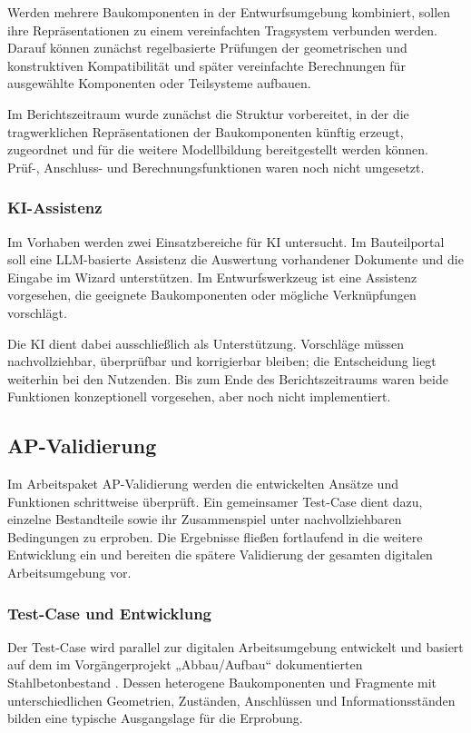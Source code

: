 \documentclass[type=zwischenbericht,theme=dark]{zukunftbau}
\begin{document}
Werden mehrere Baukomponenten in der Entwurfsumgebung kombiniert, sollen ihre Repräsentationen zu einem vereinfachten Tragsystem verbunden werden. Darauf können zunächst regelbasierte Prüfungen der geometrischen und konstruktiven Kompatibilität und später vereinfachte Berechnungen für ausgewählte Komponenten oder Teilsysteme aufbauen.

Im Berichtszeitraum wurde zunächst die Struktur vorbereitet, in der die tragwerklichen Repräsentationen der Baukomponenten künftig erzeugt, zugeordnet und für die weitere Modellbildung bereitgestellt werden können. Prüf-, Anschluss- und Berechnungsfunktionen waren noch nicht umgesetzt.

\subsubsection{KI-Assistenz}
Im Vorhaben werden zwei Einsatzbereiche für KI untersucht. Im Bauteilportal soll eine LLM-basierte Assistenz die Auswertung vorhandener Dokumente und die Eingabe im Wizard unterstützen. Im Entwurfswerkzeug ist eine Assistenz vorgesehen, die geeignete Baukomponenten oder mögliche Verknüpfungen vorschlägt.

Die KI dient dabei ausschließlich als Unterstützung. Vorschläge müssen nachvollziehbar, überprüfbar und korrigierbar bleiben; die Entscheidung liegt weiterhin bei den Nutzenden. Bis zum Ende des Berichtszeitraums waren beide Funktionen konzeptionell vorgesehen, aber noch nicht implementiert.

\subsection{AP-Validierung}

Im Arbeitspaket AP-Validierung werden die entwickelten Ansätze und Funktionen schrittweise überprüft. Ein gemeinsamer Test-Case dient dazu, einzelne Bestandteile sowie ihr Zusammenspiel unter nachvollziehbaren Bedingungen zu erproben. Die Ergebnisse fließen fortlaufend in die weitere Entwicklung ein und bereiten die spätere Validierung der gesamten digitalen Arbeitsumgebung vor.

\subsubsection{Test-Case und Entwicklung}
Der Test-Case wird parallel zur digitalen Arbeitsumgebung entwickelt und basiert auf dem im Vorgängerprojekt „Abbau/Aufbau“ dokumentierten Stahlbetonbestand \cite{henschel-abbau-aufbau-2020}. Dessen heterogene Baukomponenten und Fragmente mit unterschiedlichen Geometrien, Zuständen, Anschlüssen und Informationsständen bilden eine typische Ausgangslage für die Erprobung.
\end{document}
